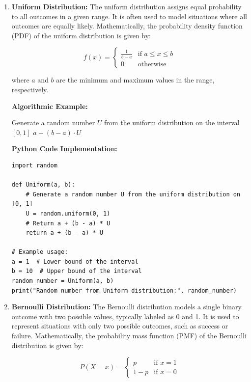 \documentclass[12pt]{book} %
\begin{document}
\begin{enumerate}
    \item \textbf{Uniform Distribution:} The uniform distribution assigns equal probability to all outcomes in a given range. It is often used to model situations where all outcomes are equally likely. Mathematically, the probability density function (PDF) of the uniform distribution is given by:
    
    \[
    f(x) = \begin{cases} 
      \frac{1}{b-a} & \text{if } a \leq x \leq b \\
      0 & \text{otherwise}
   \end{cases}
    \]
    
    where \(a\) and \(b\) are the minimum and maximum values in the range, respectively.

\textbf{Algorithmic Example:}
    \FloatBarrier
\begin{algorithm}
\caption{Generating Random Numbers from a Uniform Distribution}
\begin{algorithmic}[1]
    \State Generate a random number \(U\) from the uniform distribution on the interval \([0, 1]\)
    \State \Return \(a + (b - a) \cdot U\)
\EndProcedure
\end{algorithmic}
\end{algorithm}
\FloatBarrier
  \textbf{Python Code Implementation:}
  \FloatBarrier
  \begin{lstlisting}
import random

def Uniform(a, b):
    # Generate a random number U from the uniform distribution on [0, 1]
    U = random.uniform(0, 1)
    # Return a + (b - a) * U
    return a + (b - a) * U

# Example usage:
a = 1  # Lower bound of the interval
b = 10  # Upper bound of the interval
random_number = Uniform(a, b)
print("Random number from Uniform distribution:", random_number)
  \end{lstlisting}
  
    \item \textbf{Bernoulli Distribution:} The Bernoulli distribution models a single binary outcome with two possible values, typically labeled as 0 and 1. It is used to represent situations with only two possible outcomes, such as success or failure. Mathematically, the probability mass function (PMF) of the Bernoulli distribution is given by:
    
    \[
    P(X=x) = \begin{cases} 
      p & \text{if } x = 1 \\
      1-p & \text{if } x = 0
   \end{cases}
    \]
    

\end{enumerate}
\end{document}
